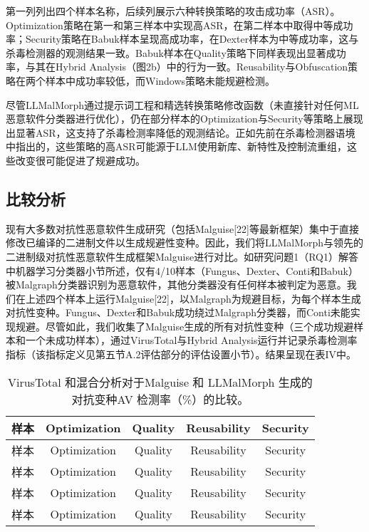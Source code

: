 第一列列出四个样本名称，后续列展示六种转换策略的攻击成功率（ASR）。Optimization策略在第一和第三样本中实现高ASR，在第二样本中取得中等成功率；Security策略在Babuk样本呈现高成功率，在Dexter样本为中等成功率，这与杀毒检测器的观测结果一致。Babuk样本在Quality策略下同样表现出显著成功率，与其在Hybrid Analysis（图2b）中的行为一致。Reusability与Obfuscation策略在两个样本中成功率较低，而Windows策略未能规避检测。


尽管LLMalMorph通过提示词工程和精选转换策略修改函数（未直接针对任何ML恶意软件分类器进行优化），仍在部分样本的Optimization与Security等策略上展现出显著ASR，这支持了杀毒检测率降低的观测结论。正如先前在杀毒检测器语境中指出的，这些策略的高ASR可能源于LLM使用新库、新特性及控制流重组，这些改变很可能促进了规避成功。

\subsection{比较分析}
现有大多数对抗性恶意软件生成研究（包括Malguise[22]等最新框架）集中于直接修改已编译的二进制文件以生成规避性变种。因此，我们将LLMalMorph与领先的二进制级对抗性恶意软件生成框架Malguise进行对比。如研究问题1（RQ1）解答中机器学习分类器小节所述，仅有4/10样本（Fungus、Dexter、Conti和Babuk）被Malgraph分类器识别为恶意软件，其他分类器没有任何样本被判定为恶意。我们在上述四个样本上运行Malguise[22]，以Malgraph为规避目标，为每个样本生成对抗性变种。Fungus、Dexter和Babuk成功绕过Malgraph分类器，而Conti未能实现规避。尽管如此，我们收集了Malguise生成的所有对抗性变种（三个成功规避样本和一个未成功样本），通过VirusTotal与Hybrid Analysis运行并记录杀毒检测率指标（该指标定义见第五节A.2评估部分的评估设置小节）。结果呈现在表IV中。

\begin{table}[htbp]
	\centering
	\caption{VirusTotal 和混合分析对于Malguise 和 LLMalMorph 生成的对抗变种AV 检测率（\%）的比较。}
	\label{tab:5.2}
	\begin{tabular*}{\textwidth}{@{\extracolsep{\fill}}ccccc}
		\toprule
		样本 & Optimization & Quality & Reusability & Security \\
		\midrule
		样本 & Optimization & Quality & Reusability & Security \\
		样本 & Optimization & Quality & Reusability & Security \\
		样本 & Optimization & Quality & Reusability & Security \\
		样本 & Optimization & Quality & Reusability & Security \\
		\bottomrule
	\end{tabular*}
\end{table}